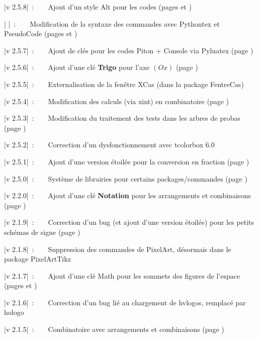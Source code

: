 \documentclass[a4paper,french,11pt]{article}
\newcommand\Cle[1]{{\bfseries\sffamily\textlangle #1\textrangle}}
\begin{document}
{\small \bverb|v 2.5.8|~:~~~~Ajout d'un style \textsf{Alt} pour les codes  (pages \pageref{pythonsimple} et \pageref{pytminted})

{\small \bverb|       |~:~~~~Modification de la syntaxe des commandes avec \textsf{Pythontex} et \textsf{PseudoCode} (pages \pageref{pythontex} et \pageref{pseudocode})

{\small \bverb|v 2.5.7|~:~~~~Ajout de clés pour les codes \textsf{Piton} + Console via \textsf{Pyluatex} (page \pageref{pythonpiton})

{\small \bverb|v 2.5.6|~:~~~~Ajout d'une clé \Cle{Trigo} pour l'axe $(Ox)$ (page \pageref{reperagetikz})

{\small \bverb|v 2.5.5|~:~~~~Externalisation de la fenêtre XCas (dans la package \textsf{FentreCas})

{\small \bverb|v 2.5.4|~:~~~~Modification des calculs (via \textsf{xint}) en combinatoire (page \pageref{combinatoire})

{\small \bverb|v 2.5.3|~:~~~~Modification du traitement des tests dans les arbres de probas (page \pageref{arbresprobas})

{\small \bverb|v 2.5.2|~:~~~~Correction d'un dysfonctionnement avec \textsf{tcolorbox 6.0}

{\small \bverb|v 2.5.1|~:~~~~Ajout d'une version étoilée pour la conversion en fraction (page \pageref{convfrac})

{\small \bverb|v 2.5.0|~:~~~~Système de \textsf{librairies} pour certains packages/commandes (page \pageref{librairies})

{\small \bverb|v 2.2.0|~:~~~~Ajout d'une clé \Cle{Notation} pour les arrangements et combinaisons (page \pageref{combinatoire})

{\small \bverb|v 2.1.9|~:~~~~Correction d'un bug (et ajout d'une version étoilée) pour les petits schémas \og de signe \fg{} (page \pageref{aidesigne})

{\small \bverb|v 2.1.8|~:~~~~Suppression des commandes de PixelArt, désormais dans le package \textsf{PixelArtTikz}

{\small \bverb|v 2.1.7|~:~~~~Ajout d'une clé \textsf{Math} pour les sommets des figures de l'espace (pages \pageref{pave} et \pageref{tetra})

{\small \bverb|v 2.1.6|~:~~~~Correction d'un bug lié au chargement de \textsf{hvlogos}, remplacé par \textsf{hologo}

{\small \bverb|v 2.1.5|~:~~~~Combinatoire avec arrangements et combinaisons (page \pageref{combinatoire})

}}}}}}}}}}}}}}}}
\end{document}
